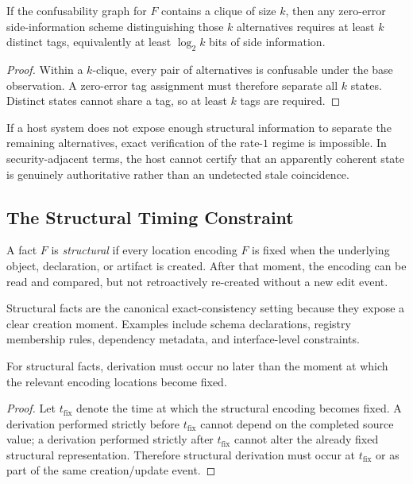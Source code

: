 \begin{lemma}\label{lem:confusability-clique}
If the confusability graph for $F$ contains a clique of size $k$, then any zero-error side-information scheme distinguishing those $k$ alternatives requires at least $k$ distinct tags, equivalently at least $\log_2 k$ bits of side information.
\end{lemma}

\begin{proof}
Within a $k$-clique, every pair of alternatives is confusable under the base observation. A zero-error tag assignment must therefore separate all $k$ states. Distinct states cannot share a tag, so at least $k$ tags are required.
\end{proof}

If a host system does not expose enough structural information to separate the remaining alternatives, exact verification of the rate-$1$ regime is impossible. In security-adjacent terms, the host cannot certify that an apparently coherent state is genuinely authoritative rather than an undetected stale coincidence.

\subsection{The Structural Timing Constraint}\label{sec:timing}

\begin{definition}\label{def:structural-fact-req}
A fact $F$ is \emph{structural} if every location encoding $F$ is fixed when the underlying object, declaration, or artifact is created. After that moment, the encoding can be read and compared, but not retroactively re-created without a new edit event.
\end{definition}

Structural facts are the canonical exact-consistency setting because they expose a clear creation moment. Examples include schema declarations, registry membership rules, dependency metadata, and interface-level constraints.

\begin{theorem}\label{thm:timing-forces}
For structural facts, derivation must occur no later than the moment at which the relevant encoding locations become fixed.
\end{theorem}

\begin{proof}
Let $t_{\mathrm{fix}}$ denote the time at which the structural encoding becomes fixed. A derivation performed strictly before $t_{\mathrm{fix}}$ cannot depend on the completed source value; a derivation performed strictly after $t_{\mathrm{fix}}$ cannot alter the already fixed structural representation. Therefore structural derivation must occur at $t_{\mathrm{fix}}$ or as part of the same creation/update event.
\end{proof}

